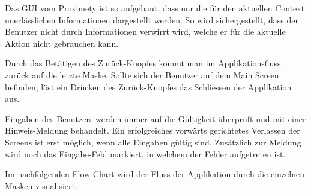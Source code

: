 Das GUI vom Proximety ist so aufgebaut, dass nur die für den aktuellen Context unerlässlichen Informationen dargestellt werden. So wird sichergestellt, dass der Benutzer nicht durch Informationen verwirrt wird, welche er für die aktuelle Aktion nicht gebrauchen kann.

Durch das Betätigen des Zurück-Knopfes kommt man im Applikationsfluss zurück auf die letzte Maske. Sollte sich der Benutzer auf dem Main Screen befinden, löst ein Drücken des Zurück-Knopfes das Schliessen der Applikation aus. 

Eingaben des Benutzers werden immer auf die Gültigkeit überprüft und mit einer Hinweis-Meldung behandelt. Ein erfolgreiches vorwärts gerichtetes Verlassen der Screens ist erst möglich, wenn alle Eingaben gültig sind. Zusätzlich zur Meldung wird noch das Eingabe-Feld markiert, in welchem der Fehler aufgetreten ist.

Im nachfolgenden Flow Chart wird der Fluss der Applikation durch die einzelnen Masken visualisiert.